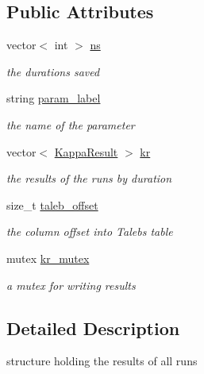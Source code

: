 \subsection*{Public Attributes}
\begin{DoxyCompactItemize}
\item 
vector$<$ int $>$ \mbox{\hyperlink{structKappaResults_a4e6a25c186ed54790616474d54a618c3}{ns}}
\begin{DoxyCompactList}\small\item\em the durations saved \end{DoxyCompactList}\item 
string \mbox{\hyperlink{structKappaResults_a2b42189a3b7690aedacd6d77c05a1c5b}{param\+\_\+label}}
\begin{DoxyCompactList}\small\item\em the name of the parameter \end{DoxyCompactList}\item 
\mbox{\label{structKappaResults_a2988f98b9b5b70ec1e3ac16e41c57ea2}} 
vector$<$ \mbox{\hyperlink{structKappaResult}{Kappa\+Result}} $>$ \mbox{\hyperlink{structKappaResults_a2988f98b9b5b70ec1e3ac16e41c57ea2}{kr}}
\begin{DoxyCompactList}\small\item\em the results of the runs by duration \end{DoxyCompactList}\item 
size\+\_\+t \mbox{\hyperlink{structKappaResults_a133dbed775f98f56566b9571ff05746d}{taleb\+\_\+offset}}
\begin{DoxyCompactList}\small\item\em the column offset into Taleb\textquotesingle{}s table \end{DoxyCompactList}\item 
\mbox{\label{structKappaResults_a9a2244648ae6ffb1d966bdc414d25240}} 
mutex \mbox{\hyperlink{structKappaResults_a9a2244648ae6ffb1d966bdc414d25240}{kr\+\_\+mutex}}
\begin{DoxyCompactList}\small\item\em a mutex for writing results \end{DoxyCompactList}\end{DoxyCompactItemize}


\subsection{Detailed Description}
structure holding the results of all runs 

